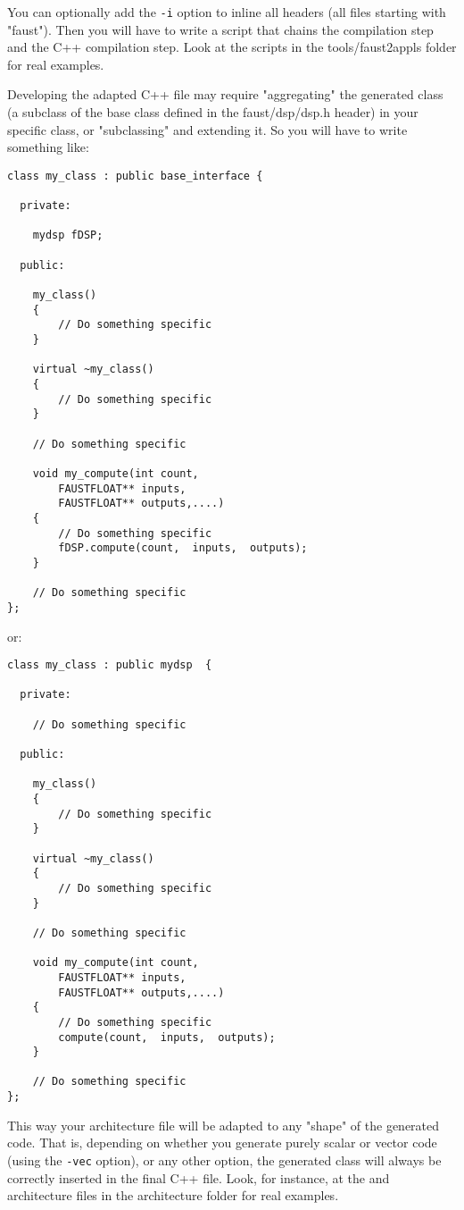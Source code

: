 You can optionally add the \lstinline'-i' option to inline all  headers (all files starting with "faust"). Then you will have to write a  script that chains the \faust compilation step and the C++ compilation step. Look at the scripts in the tools/faust2appls folder for real examples. 

Developing the adapted C++ file may require "aggregating" the generated  class (a subclass of the  base class defined in the faust/dsp/dsp.h header) in your specific class, or "subclassing" and extending it.  So you will have to write something like:

\begin{lstlisting}[basicstyle=\ttfamily\footnotesize\color{yotxt}]
class my_class : public base_interface {

  private:
	 
	mydsp fDSP;
		
  public:
  
	my_class()
	{
		// Do something specific
	}
	
	virtual ~my_class()
	{
		// Do something specific
	}
	
	// Do something specific
	
	void my_compute(int count, 
		FAUSTFLOAT** inputs, 
		FAUSTFLOAT** outputs,....)
	{
		// Do something specific
		fDSP.compute(count,  inputs,  outputs);
	}
	
	// Do something specific
};

\end{lstlisting} 

or:

\begin{lstlisting}[basicstyle=\ttfamily\footnotesize\color{yotxt}]
class my_class : public mydsp  {

  private:
  
  	// Do something specific
		
  public:
  
	my_class()
	{
		// Do something specific
	}
	
	virtual ~my_class()
	{
		// Do something specific
	}
	
	// Do something specific
	
	void my_compute(int count, 
		FAUSTFLOAT** inputs, 
		FAUSTFLOAT** outputs,....)
	{
		// Do something specific
		compute(count,  inputs,  outputs);
	}
	
	// Do something specific
};
\end{lstlisting} 

This way your architecture file will be adapted to any "shape" of the generated code. That is, depending on whether you generate purely scalar or vector code (using the \lstinline'-vec' option), or any other option, the generated  class will always be correctly inserted in the final C++ file. Look, for instance, at the  and  architecture files in the architecture folder for real examples. 
